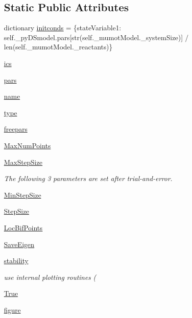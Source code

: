 \subsection*{Static Public Attributes}
\begin{DoxyCompactItemize}
\item 
dictionary \hyperlink{class_mu_mo_t_1_1_mu_mo_tbifurcation_view_a23ca095d6146b220be161f1f73017674}{initconds} = \{state\+Variable1\+: self.\+\_\+py\+D\+Smodel.\+pars\mbox{[}str(self.\+\_\+mumot\+Model.\+\_\+system\+Size)\mbox{]} / len(self.\+\_\+mumot\+Model.\+\_\+reactants)\}
\item 
\hyperlink{class_mu_mo_t_1_1_mu_mo_tbifurcation_view_a08c7b0edb053705a8c47fe487b6f53bd}{ics}
\item 
\hyperlink{class_mu_mo_t_1_1_mu_mo_tbifurcation_view_a372cc7d4f485e77e35668d40b507d0e5}{pars}
\item 
\hyperlink{class_mu_mo_t_1_1_mu_mo_tbifurcation_view_ab74e6bf80237ddc4109968cedc58c151}{name}
\item 
\hyperlink{class_mu_mo_t_1_1_mu_mo_tbifurcation_view_a7aead736a07eaf25623ad7bfa1f0ee2d}{type}
\item 
\hyperlink{class_mu_mo_t_1_1_mu_mo_tbifurcation_view_a15cf90b3888db001a8299a477d50af98}{freepars}
\item 
\hyperlink{class_mu_mo_t_1_1_mu_mo_tbifurcation_view_aaa677c130e36435865b68ff6230a932d}{Max\+Num\+Points}
\item 
\hyperlink{class_mu_mo_t_1_1_mu_mo_tbifurcation_view_a0a7557ffe670b6a318afa8bd9851d2fc}{Max\+Step\+Size}
\begin{DoxyCompactList}\small\item\em The following 3 parameters are set after trial-\/and-\/error. \end{DoxyCompactList}\item 
\hyperlink{class_mu_mo_t_1_1_mu_mo_tbifurcation_view_a5fe506ca005e76a55ccd505a36e17fe6}{Min\+Step\+Size}
\item 
\hyperlink{class_mu_mo_t_1_1_mu_mo_tbifurcation_view_a9c25479455e9bdd389f37c4bccfefea1}{Step\+Size}
\item 
\hyperlink{class_mu_mo_t_1_1_mu_mo_tbifurcation_view_a7ff5325c1fceeebd63c3e4805a2206c8}{Loc\+Bif\+Points}
\item 
\hyperlink{class_mu_mo_t_1_1_mu_mo_tbifurcation_view_a040a7ecbcbaca807aeaec6d5c81801d5}{Save\+Eigen}
\item 
\hyperlink{class_mu_mo_t_1_1_mu_mo_tbifurcation_view_a1df8fcdacfec00fc258a3c72772c2f18}{stability}
\begin{DoxyCompactList}\small\item\em use internal plotting routines ( \end{DoxyCompactList}\item 
\hyperlink{class_mu_mo_t_1_1_mu_mo_tbifurcation_view_a643a20c0c59588a0f741a6095e2025fd}{True}
\item 
\hyperlink{class_mu_mo_t_1_1_mu_mo_tbifurcation_view_a391e34f2de441d79152a7b3d6e4c9c86}{figure}
\end{DoxyCompactItemize}
